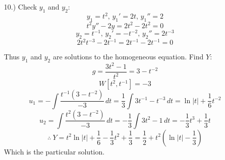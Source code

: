 \documentclass[12pt]{article}
\newcommand{\vertb}[1]{\left\vert#1\right\vert}
\newcommand{\parns}[1]{\left(#1\right)}
\begin{document}
\begin{itemize}
    \item [10.)] Check $y_1$ and $y_2$:
    \[y_1=t^2,\,y_1'=2t,\,y_1''=2\]
    \[t^2y''-2y=2t^2-2t^2=0\]
    \[y_2=t^{-1},\,y_2'=-t^{-2},\,y_2''=2t^{-3}\]
    \[2t^2t^{-3}-2t^{-1}=2t^{-1}-2t^{-1}=0\]

    \pagebreak
    Thus $y_1$ and $y_2$ are solutions to the homogeneous equation. Find $Y$:
    \[g=\frac{3t^2-1}{t^2}=3-t^{-2}\]
    \[W[t^2,t^{-1}]=-3\]
    \[u_1=-\int\frac{t^{-1}(3-t^{-2})}{-3}\,dt=\frac{1}{3}\int3t^{-1}-t^{-3}\,dt=\ln\vertb{t}+\frac{1}{6}t^{-2}\]
    \[u_2=\int\frac{t^2(3-t^{-2})}{-3}\,dt=-\frac{1}{3}\int3t^2-1\,dt=-\frac{1}{3}t^3+\frac{1}{3}t\]
    \[\therefore\ Y=t^2\ln\vertb{t}+\frac{1}{6}-\frac{1}{3}t^2+\frac{1}{3}=\frac{1}{2}+t^2\parns{\ln\vertb{t}-\frac{1}{3}}\]
    Which is the particular solution.
\end{itemize}
\end{document}
